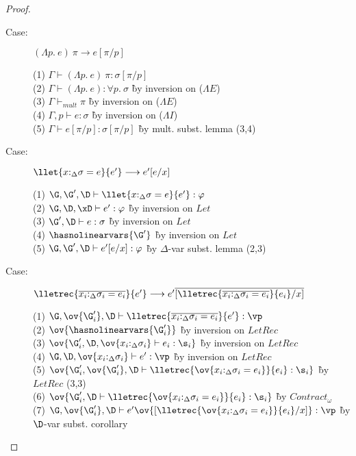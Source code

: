\begin{proof}
\begin{description}
\item[Case:] $(\Lambda p.~e)~\pi \longrightarrow e[\pi/p]$
\begin{tabbing}
(1) $\Gamma \vdash (\Lambda p.~e)~\pi : \sigma[\pi/p]$\\
(2) $\Gamma \vdash (\Lambda p.~e) : \forall p.~\sigma$ \` by inversion on ($\Lambda E$) \\
(3) $\Gamma \vdash_{mult} \pi$ \` by inversion on ($\Lambda E$) \\
(4) $\Gamma, p \vdash e : \sigma$ \` by inversion on ($\Lambda I$) \\
(5) $\Gamma \vdash e[\pi/p]:\sigma[\pi/p]$ \` by mult. subst. lemma (3,4) \\
\end{tabbing}

\item[Case:] $\llet{x{:}_\Delta\sigma = e}{e'}\longrightarrow e'[e/x]$
\begin{tabbing}
(1) $\G, \G', \D\vdash \llet{x{:}_\Delta\sigma = e}{e'} : \varphi$\\
(2) $\G, \D, \xD \vdash e' : \varphi$ \` by inversion on $Let$ \\
(3) $\G', \D \vdash e : \sigma$ \` by inversion on $Let$\\
(4) $\hasnolinearvars{\G'}$ \` by inversion on $Let$\\
(5) $\G, \G', \D \vdash e'[e/x] : \varphi$ \` by $\Delta$-var subst. lemma (2,3)\\
\end{tabbing}

\item[Case:] $\lletrec{\overline{x_i{:}_\Delta\sigma_i = e_i}}{e'}
    \longrightarrow e'\overline{[\lletrec{\overline{x_i{:}_\Delta\sigma_i = e_i}}{e_i}/x]}$
\begin{tabbing}
    (1) $\G, \ov{\G'_i}, \D \vdash \lletrec{\overline{x_i{:}_\Delta\sigma_i = e_i}}{e'} : \vp$\\
    (2) $\ov{\hasnolinearvars{\G'_i}}$ \` by inversion on $LetRec$\\
    (3) $\ov{\G'_i,\D, \ov{x_i{:}_\Delta\sigma_i} \vdash e_i : \s_i}$ \` by inversion on $LetRec$\\
    (4) $\G, \D, \ov{x_i{:}_\Delta\sigma_i} \vdash e' : \vp$ \` by inversion on $LetRec$\\
    (5) $\ov{\G'_i, \ov{\G'_i}, \D \vdash \lletrec{\ov{x_i{:}_\Delta\sigma_i = e_i}}{e_i} : \s_i}$ \` by $LetRec$ (3,3)\\
    (6) $\ov{\G'_i, \D \vdash \lletrec{\ov{x_i{:}_\Delta\sigma_i = e_i}}{e_i} : \s_i}$ \` by $Contract_\omega$\\
    (7) $\G, \ov{\G'_i}, \D \vdash e'\ov{[\lletrec{\ov{x_i{:}_\Delta\sigma_i = e_i}}{e_i}/x]} :
    \vp$ \` by $\D$-var subst. corollary\\
\end{tabbing}


\end{description}
\end{proof}

